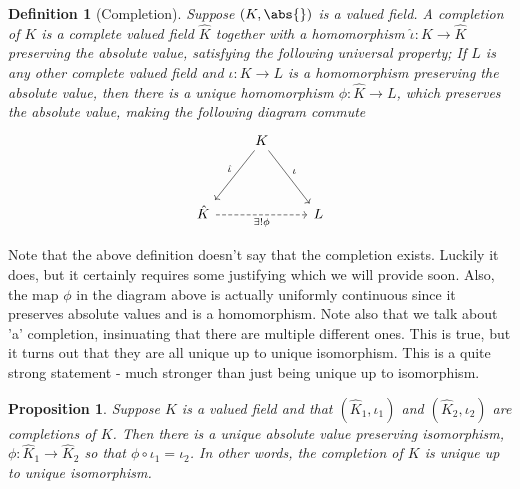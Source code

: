 \documentclass{article}
\newtheorem{definition}{Definition}[section]
\newtheorem{proposition}{Proposition}[section]
\numberwithin{equation}{section}
\begin{document}
\begin{definition}[Completion]\label{def: Completion}
    Suppose $(K, \abs{})$ is a valued field. A completion of $K$ is a complete valued field $\hat K$ together with a homomorphism $\hat \iota : K \to \hat K$ preserving the absolute value, satisfying the following universal property; If $L$ is any other complete valued field and $\iota : K \to L$ is a homomorphism preserving the absolute value, then there is a unique homomorphism $\phi : \hat K \to L$, which preserves the absolute value, making the following diagram commute
    \[\begin{tikzcd}
            & K \\
            \\
            \hat K && L
            \arrow["{\exists! \phi}"', dashed, from=3-1, to=3-3]
            \arrow["{\hat \iota}"', from=1-2, to=3-1]
            \arrow["{\iota}", from=1-2, to=3-3]
        \end{tikzcd}\]
\end{definition}
Note that the above definition doesn't say that the completion exists. Luckily it does, but it certainly requires some justifying which we will provide soon. Also, the map $\phi$ in the diagram above is actually uniformly continuous since it preserves absolute values and is a homomorphism. Note also that we talk about 'a' completion, insinuating that there are multiple different ones. This is true, but it turns out that they are all unique up to unique isomorphism. This is a quite strong statement - much stronger than just being unique up to isomorphism.




\begin{proposition}
    Suppose $K$ is a valued field and that $(\hat K_1, \iota_1)$ and $(\hat K_2, \iota_2)$ are completions of $K$. Then there is a unique absolute value preserving isomorphism, $\phi : \hat K_1 \to \hat K_2$ so that $\phi \circ \iota_1 = \iota_2$. In other words, the completion of $K$ is unique up to unique isomorphism.
\end{proposition}
\end{document}
